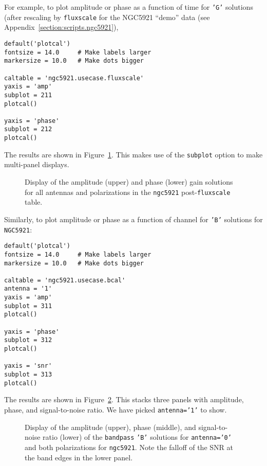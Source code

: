 For example, to plot amplitude or phase as a function of time for 
{\tt 'G'} solutions (after rescaling by {\tt fluxscale} for the NGC5921
``demo'' data (see Appendix~\ref{section:scripts.ngc5921}),
\small
\begin{verbatim}
default('plotcal')
fontsize = 14.0     # Make labels larger
markersize = 10.0   # Make dots bigger

caltable = 'ngc5921.usecase.fluxscale'
yaxis = 'amp'
subplot = 211
plotcal()

yaxis = 'phase'
subplot = 212
plotcal()
\end{verbatim}
\normalsize
The results are shown in Figure~\ref{fig:plotcal_G_5921}.  This makes 
use of the {\tt subplot} option to make multi-panel displays.

\begin{figure}[h!]
\begin{center}
\caption{\label{fig:plotcal_G_5921} Display of the amplitude (upper)
and phase (lower) gain solutions for all antennas and polarizations 
in the {\tt ngc5921} post-{\tt fluxscale} table.} 
\hrulefill
\end{center}
\end{figure}


Similarly, to plot amplitude or phase as a function of channel for
{\tt 'B'} solutions for {\tt NGC5921}:
\small
\begin{verbatim}
default('plotcal')
fontsize = 14.0     # Make labels larger
markersize = 10.0   # Make dots bigger

caltable = 'ngc5921.usecase.bcal'
antenna = '1'
yaxis = 'amp'
subplot = 311
plotcal()

yaxis = 'phase'
subplot = 312
plotcal()

yaxis = 'snr'
subplot = 313
plotcal()
\end{verbatim}
\normalsize
The results are shown in Figure~\ref{fig:plotcal_B_5921}.  This stacks
three panels with amplitude, phase, and signal-to-noise ratio.  We
have picked {\tt antenna='1'} to show.

\begin{figure}[h!]
\begin{center}
\caption{\label{fig:plotcal_B_5921} Display of the amplitude (upper),
phase (middle), and signal-to-noise ratio (lower) of the
{\tt bandpass} {\tt 'B'} solutions for {\tt antenna='0'} and both
polarizations for {\tt ngc5921}.  Note the falloff of the SNR at
the band edges in the lower panel.} 
\hrulefill
\end{center}
\end{figure}

